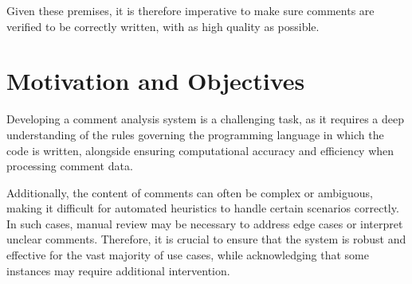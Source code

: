 \noindent Given these premises, it is therefore imperative to make sure comments are verified to be correctly written, with as high quality as possible.


\section{Motivation and Objectives}
Developing a comment analysis system \cite{commentAnalysis} is a challenging task, as it requires a deep understanding of the rules governing the programming language in which the code is written, alongside ensuring computational accuracy and efficiency when processing comment data.

\noindent Additionally, the content of comments can often be complex or ambiguous, making it difficult for automated heuristics to handle certain scenarios correctly. In such cases, manual review may be necessary to address edge cases or interpret unclear comments.
Therefore, it is crucial to ensure that the system is robust and effective for the vast majority of use cases, while acknowledging that some instances may require additional intervention.


